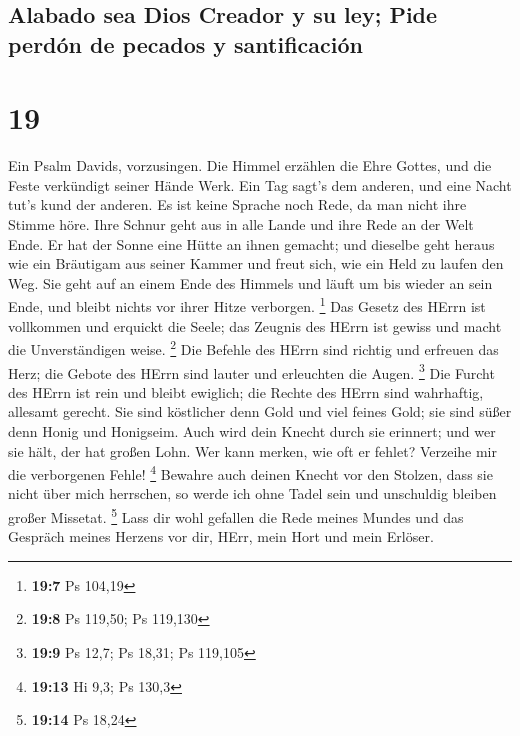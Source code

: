 \hypertarget{alabado-sea-dios-creador-y-su-ley-pide-perduxf3n-de-pecados-y-santificaciuxf3n}{%
\subsection{Alabado sea Dios Creador y su ley; Pide perdón de pecados y
santificación}\label{alabado-sea-dios-creador-y-su-ley-pide-perduxf3n-de-pecados-y-santificaciuxf3n}}

\hypertarget{section-18}{%
\section{19}\label{section-18}}

 Ein Psalm Davids, vorzusingen.  Die Himmel
erzählen die Ehre Gottes, und die Feste verkündigt seiner Hände Werk.
 Ein Tag sagt's dem anderen, und eine Nacht tut's kund der
anderen.  Es ist keine Sprache noch Rede, da man nicht
ihre Stimme höre.  Ihre Schnur geht aus in alle Lande und
ihre Rede an der Welt Ende. Er hat der Sonne eine Hütte an ihnen
gemacht;  und dieselbe geht heraus wie ein Bräutigam aus
seiner Kammer und freut sich, wie ein Held zu laufen den Weg.
 Sie geht auf an einem Ende des Himmels und läuft um bis
wieder an sein Ende, und bleibt nichts vor ihrer Hitze verborgen.
\footnote{\textbf{19:7} Ps 104,19}  Das Gesetz des HErrn
ist vollkommen und erquickt die Seele; das Zeugnis des HErrn ist gewiss
und macht die Unverständigen weise. \footnote{\textbf{19:8} Ps 119,50;
  Ps 119,130}  Die Befehle des HErrn sind richtig und
erfreuen das Herz; die Gebote des HErrn sind lauter und erleuchten die
Augen. \footnote{\textbf{19:9} Ps 12,7; Ps 18,31; Ps 119,105}
 Die Furcht des HErrn ist rein und bleibt ewiglich; die
Rechte des HErrn sind wahrhaftig, allesamt gerecht.  Sie
sind köstlicher denn Gold und viel feines Gold; sie sind süßer denn
Honig und Honigseim.  Auch wird dein Knecht durch sie
erinnert; und wer sie hält, der hat großen Lohn.  Wer
kann merken, wie oft er fehlet? Verzeihe mir die verborgenen Fehle!
\footnote{\textbf{19:13} Hi 9,3; Ps 130,3}  Bewahre auch
deinen Knecht vor den Stolzen, dass sie nicht über mich herrschen, so
werde ich ohne Tadel sein und unschuldig bleiben großer Missetat.
\footnote{\textbf{19:14} Ps 18,24}  Lass dir wohl
gefallen die Rede meines Mundes und das Gespräch meines Herzens vor dir,
HErr, mein Hort und mein Erlöser.

